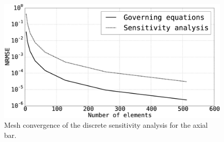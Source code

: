 %
\begin{figure}[h]
    \centering
    \includegraphics[width=14.00cm]{Chapter_2/figure/axial_bar_discrete_sensitivity_analysis.eps}
    \caption{Mesh convergence of the discrete sensitivity analysis for the axial bar.}
    \label{fig:C2_barDiscreteSensitivityAnalysis}
\end{figure}
%